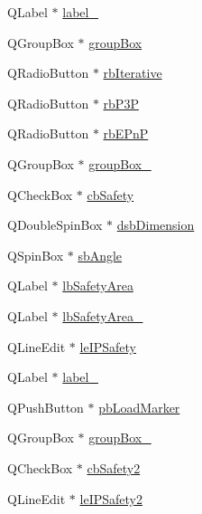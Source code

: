 \begin{DoxyCompactItemize}
Q\+Label $\ast$ \hyperlink{class_ui___rigid_track_class_adad99dbe226b6a900918729abb37a6b8}{label\+\_}
\item 
Q\+Group\+Box $\ast$ \hyperlink{class_ui___rigid_track_class_a895128ce9cc7dda6c57b654512e12e7d}{group\+Box}
\item 
Q\+Radio\+Button $\ast$ \hyperlink{class_ui___rigid_track_class_a7ee2c6448b82ecb455b4f6122ea8dbeb}{rb\+Iterative}
\item 
Q\+Radio\+Button $\ast$ \hyperlink{class_ui___rigid_track_class_a3f20a41a0b0d35ff5a077530743c82c9}{rb\+P3P}
\item 
Q\+Radio\+Button $\ast$ \hyperlink{class_ui___rigid_track_class_a1c45060b8c85c0e4cfe4a7c1e40f203a}{rb\+E\+PnP}
\item 
Q\+Group\+Box $\ast$ \hyperlink{class_ui___rigid_track_class_a85d7c172656cb175131c5da83caf6a48}{group\+Box\+\_}
\item 
Q\+Check\+Box $\ast$ \hyperlink{class_ui___rigid_track_class_a44e812df547a219bdf2b43383a4e849b}{cb\+Safety}
\item 
Q\+Double\+Spin\+Box $\ast$ \hyperlink{class_ui___rigid_track_class_a20f78b58534d29da3d836c2af79a6232}{dsb\+Dimension}
\item 
Q\+Spin\+Box $\ast$ \hyperlink{class_ui___rigid_track_class_ac232f3d19d53b00aa61431725cbf71c4}{sb\+Angle}
\item 
Q\+Label $\ast$ \hyperlink{class_ui___rigid_track_class_a0996dad75e113e08fcaee07e55ceaca6}{lb\+Safety\+Area}
\item 
Q\+Label $\ast$ \hyperlink{class_ui___rigid_track_class_ace9b8966d2c9a38ef4bd4ba17db70c5a}{lb\+Safety\+Area\+\_}
\item 
Q\+Line\+Edit $\ast$ \hyperlink{class_ui___rigid_track_class_af722611603b357175b3ce505bdf468b1}{le\+I\+P\+Safety}
\item 
Q\+Label $\ast$ \hyperlink{class_ui___rigid_track_class_a40dc760bee515c66ebe81f67b2d7f5f9}{label\+\_}
\item 
Q\+Push\+Button $\ast$ \hyperlink{class_ui___rigid_track_class_a76c00d83ae38b7eaa03ef28c280631fa}{pb\+Load\+Marker}
\item 
Q\+Group\+Box $\ast$ \hyperlink{class_ui___rigid_track_class_a822d802011c4868603863fa70f5589ae}{group\+Box\+\_}
\item 
Q\+Check\+Box $\ast$ \hyperlink{class_ui___rigid_track_class_a1e5273e53cb1276c8c056f1da4e72910}{cb\+Safety2}
\item 
Q\+Line\+Edit $\ast$ \hyperlink{class_ui___rigid_track_class_a70522f29594cbdc654ffed858b3e1fc5}{le\+I\+P\+Safety2}

\end{DoxyCompactItemize}
